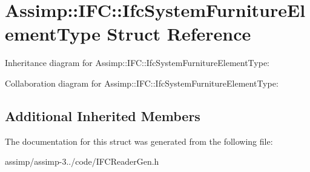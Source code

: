 \hypertarget{struct_assimp_1_1_i_f_c_1_1_ifc_system_furniture_element_type}{\section{Assimp\+:\+:I\+F\+C\+:\+:Ifc\+System\+Furniture\+Element\+Type Struct Reference}
\label{struct_assimp_1_1_i_f_c_1_1_ifc_system_furniture_element_type}
}


Inheritance diagram for Assimp\+:\+:I\+F\+C\+:\+:Ifc\+System\+Furniture\+Element\+Type\+:


Collaboration diagram for Assimp\+:\+:I\+F\+C\+:\+:Ifc\+System\+Furniture\+Element\+Type\+:
\subsection*{Additional Inherited Members}


The documentation for this struct was generated from the following file\+:\begin{DoxyCompactItemize}
\item 
assimp/assimp-\/3../code/I\+F\+C\+Reader\+Gen.\+h\end{DoxyCompactItemize}
